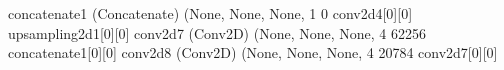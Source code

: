 \documentclass[letterpaper,10pt,english]{sphinxmanual}
\begin{document}
\begin{sphinxVerbatim}[commandchars=\\\{\}]
concatenate\PYGZus{}1 (Concatenate)     (None, None, None, 1 0           conv2d\PYGZus{}4[0][0]                   
                                                                 up\PYGZus{}sampling2d\PYGZus{}1[0][0]            
\PYGZus{}\PYGZus{}\PYGZus{}\PYGZus{}\PYGZus{}\PYGZus{}\PYGZus{}\PYGZus{}\PYGZus{}\PYGZus{}\PYGZus{}\PYGZus{}\PYGZus{}\PYGZus{}\PYGZus{}\PYGZus{}\PYGZus{}\PYGZus{}\PYGZus{}\PYGZus{}\PYGZus{}\PYGZus{}\PYGZus{}\PYGZus{}\PYGZus{}\PYGZus{}\PYGZus{}\PYGZus{}\PYGZus{}\PYGZus{}\PYGZus{}\PYGZus{}\PYGZus{}\PYGZus{}\PYGZus{}\PYGZus{}\PYGZus{}\PYGZus{}\PYGZus{}\PYGZus{}\PYGZus{}\PYGZus{}\PYGZus{}\PYGZus{}\PYGZus{}\PYGZus{}\PYGZus{}\PYGZus{}\PYGZus{}\PYGZus{}\PYGZus{}\PYGZus{}\PYGZus{}\PYGZus{}\PYGZus{}\PYGZus{}\PYGZus{}\PYGZus{}\PYGZus{}\PYGZus{}\PYGZus{}\PYGZus{}\PYGZus{}\PYGZus{}\PYGZus{}\PYGZus{}\PYGZus{}\PYGZus{}\PYGZus{}\PYGZus{}\PYGZus{}\PYGZus{}\PYGZus{}\PYGZus{}\PYGZus{}\PYGZus{}\PYGZus{}\PYGZus{}\PYGZus{}\PYGZus{}\PYGZus{}\PYGZus{}\PYGZus{}\PYGZus{}\PYGZus{}\PYGZus{}\PYGZus{}\PYGZus{}\PYGZus{}\PYGZus{}\PYGZus{}\PYGZus{}\PYGZus{}\PYGZus{}\PYGZus{}\PYGZus{}\PYGZus{}\PYGZus{}
conv2d\PYGZus{}7 (Conv2D)               (None, None, None, 4 62256       concatenate\PYGZus{}1[0][0]              
\PYGZus{}\PYGZus{}\PYGZus{}\PYGZus{}\PYGZus{}\PYGZus{}\PYGZus{}\PYGZus{}\PYGZus{}\PYGZus{}\PYGZus{}\PYGZus{}\PYGZus{}\PYGZus{}\PYGZus{}\PYGZus{}\PYGZus{}\PYGZus{}\PYGZus{}\PYGZus{}\PYGZus{}\PYGZus{}\PYGZus{}\PYGZus{}\PYGZus{}\PYGZus{}\PYGZus{}\PYGZus{}\PYGZus{}\PYGZus{}\PYGZus{}\PYGZus{}\PYGZus{}\PYGZus{}\PYGZus{}\PYGZus{}\PYGZus{}\PYGZus{}\PYGZus{}\PYGZus{}\PYGZus{}\PYGZus{}\PYGZus{}\PYGZus{}\PYGZus{}\PYGZus{}\PYGZus{}\PYGZus{}\PYGZus{}\PYGZus{}\PYGZus{}\PYGZus{}\PYGZus{}\PYGZus{}\PYGZus{}\PYGZus{}\PYGZus{}\PYGZus{}\PYGZus{}\PYGZus{}\PYGZus{}\PYGZus{}\PYGZus{}\PYGZus{}\PYGZus{}\PYGZus{}\PYGZus{}\PYGZus{}\PYGZus{}\PYGZus{}\PYGZus{}\PYGZus{}\PYGZus{}\PYGZus{}\PYGZus{}\PYGZus{}\PYGZus{}\PYGZus{}\PYGZus{}\PYGZus{}\PYGZus{}\PYGZus{}\PYGZus{}\PYGZus{}\PYGZus{}\PYGZus{}\PYGZus{}\PYGZus{}\PYGZus{}\PYGZus{}\PYGZus{}\PYGZus{}\PYGZus{}\PYGZus{}\PYGZus{}\PYGZus{}\PYGZus{}\PYGZus{}
conv2d\PYGZus{}8 (Conv2D)               (None, None, None, 4 20784       conv2d\PYGZus{}7[0][0]                   
\PYGZus{}\PYGZus{}\PYGZus{}\PYGZus{}\PYGZus{}\PYGZus{}\PYGZus{}\PYGZus{}\PYGZus{}\PYGZus{}\PYGZus{}\PYGZus{}\PYGZus{}\PYGZus{}\PYGZus{}\PYGZus{}\PYGZus{}\PYGZus{}\PYGZus{}\PYGZus{}\PYGZus{}\PYGZus{}\PYGZus{}\PYGZus{}\PYGZus{}\PYGZus{}\PYGZus{}\PYGZus{}\PYGZus{}\PYGZus{}\PYGZus{}\PYGZus{}\PYGZus{}\PYGZus{}\PYGZus{}\PYGZus{}\PYGZus{}\PYGZus{}\PYGZus{}\PYGZus{}\PYGZus{}\PYGZus{}\PYGZus{}\PYGZus{}\PYGZus{}\PYGZus{}\PYGZus{}\PYGZus{}\PYGZus{}\PYGZus{}\PYGZus{}\PYGZus{}\PYGZus{}\PYGZus{}\PYGZus{}\PYGZus{}\PYGZus{}\PYGZus{}\PYGZus{}\PYGZus{}\PYGZus{}\PYGZus{}\PYGZus{}\PYGZus{}\PYGZus{}\PYGZus{}\PYGZus{}\PYGZus{}\PYGZus{}\PYGZus{}\PYGZus{}\PYGZus{}\PYGZus{}\PYGZus{}\PYGZus{}\PYGZus{}\PYGZus{}\PYGZus{}\PYGZus{}\PYGZus{}\PYGZus{}\PYGZus{}\PYGZus{}\PYGZus{}\PYGZus{}\PYGZus{}\PYGZus{}\PYGZus{}\PYGZus{}\PYGZus{}\PYGZus{}\PYGZus{}\PYGZus{}\PYGZus{}\PYGZus{}\PYGZus{}\PYGZus{}\PYGZus{}

\end{sphinxVerbatim}
\end{document}
